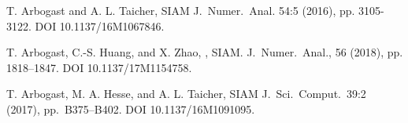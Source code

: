 \documentclass[usenames,dvipsnames,letterpaper,landscape,final]{slides}
\begin{document}
\begin{myslideNoFooter}
\begin{nlist}
\item T. Arbogast and A. L. Taicher,  SIAM J.\ Numer.\ Anal. 54:5 (2016), pp. 3105-3122. DOI 10.1137/16M1067846.
\item T. Arbogast, C.-S. Huang, and X. Zhao, , SIAM. J.\ Numer.\ Anal., 56 (2018), pp. 1818–1847. DOI 10.1137/17M1154758.
\item T. Arbogast, M. A. Hesse, and A. L. Taicher,  SIAM J.\
  Sci.\ Comput.\ 39:2 (2017), pp.~B375--B402. DOI 10.1137/16M1091095.

\end{nlist}
\end{myslideNoFooter}



\end{document}
